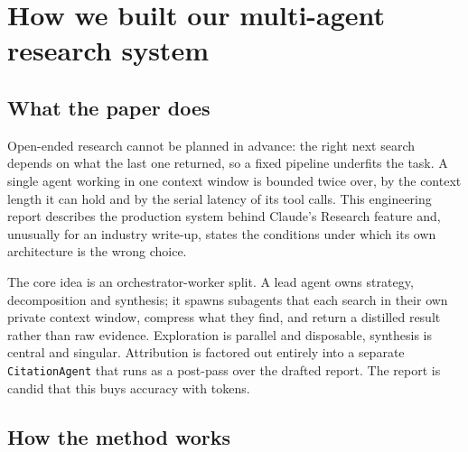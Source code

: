 \section{How we built our multi-agent research system}

\subsection{What the paper does}

Open-ended research cannot be planned in advance: the right next search depends on what the last one returned, so a fixed pipeline underfits the task. A single agent working in one context window is bounded twice over, by the context length it can hold and by the serial latency of its tool calls. This engineering report describes the production system behind Claude's Research feature and, unusually for an industry write-up, states the conditions under which its own architecture is the wrong choice.

The core idea is an orchestrator-worker split. A lead agent owns strategy, decomposition and synthesis; it spawns subagents that each search in their own private context window, compress what they find, and return a distilled result rather than raw evidence. Exploration is parallel and disposable, synthesis is central and singular. Attribution is factored out entirely into a separate \texttt{CitationAgent} that runs as a post-pass over the drafted report. The report is candid that this buys accuracy with tokens.

\subsection{How the method works}

